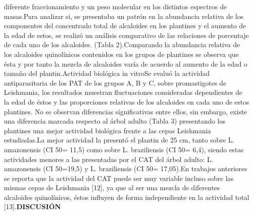 \documentclass{article}
\begin{document}
diferente fraccionamiento y un peso molecular en los distintos espectros de masas.Para analizar si, se presentaba un patrón en la abundancia relativa de los componentes del concentrado total de alcaloides en los plantines y el aumento de la edad de estos, se realizó un análisis comparativo de las relaciones de porcentaje de cada uno de los alcaloides. (Tabla 2).Comparando la abundancia relativa de los alcaloides quinolínicos contenidos en los grupos de plantines se observa que ésta y por tanto la mezcla de alcaloides varía de acuerdo al aumento de la edad o tamaño del plantin.Actividad biológica in vitroSe evaluó la actividad antiparasitaria de los PAT de los grupos A, B y C, sobre promastigotes de Leishmania, los resultados muestran fluctuaciones consideradas dependientes de la edad de éstos y las proporciones relativas de los alcaloides en cada uno de estos plantines. No se observan diferencias significativas entre ellos, sin embargo, existe una diferencia marcada respecto al árbol adulto (Tabla 3) presentando los plantines una mejor actividad biológica frente a las cepas Leishmania estudiadas.La mejor actividad la presentó el plantin de 25 cm, tanto sobre L. amazonensis (CI 50= 11,5) como sobre L. braziliensis (CI 50= 6,4), siendo estas actividades menores a las presentadas por el CAT del árbol adulto: L. amazonensis (CI 50=19,5) y L. braziliensis (CI 50= 17,05).En trabajos anteriores se reporta que la actividad del CAT puede ser muy variable incluso sobre las mismas cepas de Leishmania [12], ya que al ser una mezcla de diferentes alcaloides quinolínicos, éstos influyen de forma independiente en la actividad total [13].\textbf{DISCUSIÓN}
\end{document}
